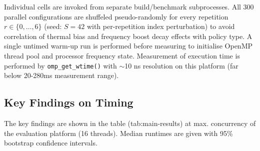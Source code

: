 \documentclass[conference]{IEEEtran}
\begin{document}
Individual cells are invoked from separate build/benchmark subprocesses. All 300 parallel configurations are shuffeled pseudo-randomly for every repetition $r \in \{0, \ldots, 6\}$ (seed: $S = 42$ with per-repetition index perturbation) to avoid correlation of thermal bias and frequency boost decay effects with policy type. A single untimed warm-up run is performed before measuring to initialise OpenMP thread pool and processor frequency state. Measurement of execution time is performed by \texttt{omp\_get\_wtime()} with $\sim$10 ns resolution on this platform (far below 20-280ms measurement range).

\subsection{Key Findings on Timing}

The key findings are shown in the table (tab:main-results) at max. concurrency of the evaluation platform (16 threads). Median runtimes are given with 95\% bootstrap confidence intervals.

\begin{table}[htbp]
\centering
\caption{Median Runtime (ms) at 16 threads (95\% Bootstrap CI)}
\label{tab:main-results}
\end{table}
\end{document}
